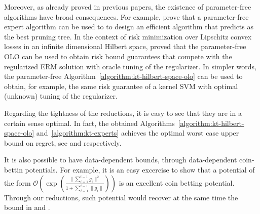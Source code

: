 Moreover, as already proved in previous papers, the existence of parameter-free
algorithms have broad consequences. For example, \citet{LuoS15} prove that a
parameter-free expert algorithm can be used to to design an efficient algorithm
that predicts as the best pruning tree. In the context of risk minimization over
Lipschitz convex losses in an infinite dimensional Hilbert space,
\citet{Orabona14} proved that the parameter-free \ac{OLO} can be used to obtain
risk bound guarantees that compete with the regularized \ac{ERM} solution with
oracle tuning of the regularizer. In simpler words, the parameter-free
Algorithm~\ref{algorithm:kt-hilbert-space-olo} can be used to obtain, for
example, the same risk guarantee of a kernel \ac{SVM} with optimal (unknown)
tuning of the regularizer.

Regarding the tightness of the reductions, it is easy to see that they are in a
certain sense optimal. In fact, the obtained
Algorithms~\ref{algorithm:kt-hilbert-space-olo} and~\ref{algorithm:kt-experts}
achieves the optimal worst case upper bound on regret, see \citet{Orabona13} and
\citet{Cesa-BianchiL06} respectively.

It is also possible to have data-dependent bounds, through data-dependent
coin-bettin potentials. For example, it is an easy excercise to show that a
potential of the form $\mathcal{O}\left(\exp \left(\frac{\|\sum_{i=1}^{t-1}
g_{i}\|^2}{1+\sum_{i=1}^{t-1} \|g_{i}\|}\right)\right)$ is an excellent coin
betting potential. Through our reductions, such potential would recover at the
same time the bound in \citet{LuoS15} and \citet{Orabona14}.
